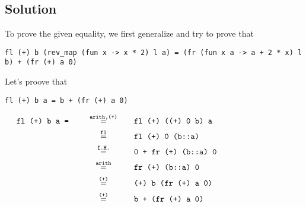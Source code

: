 \subsection*{Solution}

To prove the given equality, we first generalize and try to prove that
\begin{center}
    \texttt{fl (+) b (rev\_map (fun x -> x * 2) l a) = (fr (fun x a -> a + 2 * x) l b) + (fr (+) a 0)}
\end{center}

Let's proove that
\begin{center}
    \texttt{fl (+) b a = b + (fr (+) a 0)}
\end{center}

\begin{displaymath}
    \begin{aligned}
        \texttt{fl (+) b a = }
        &\eq{arith,(+)}{fl (+) ((+) 0 b) a} \\
        &\eq{fl}{fl (+) 0 (b::a)} \\
        &\eq{I.H.}{0 + fr (+) (b::a) 0} \\
        &\eq{arith}{fr (+) (b::a) 0} \\
        &\eq{(+)}{(+) b (fr (+) a 0)} \\
        &\eq{(+)}{b + (fr (+) a 0)}
    \end{aligned}
\end{displaymath}



